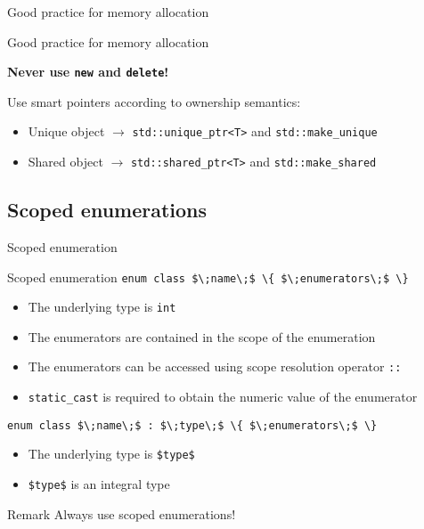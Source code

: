 \begin{frame}{Good practice for memory allocation}{}
  \begin{block}{Good practice for memory allocation}
    \begin{center}
      \Large
      \bfseries
      Never use \lstinline!new! and \lstinline!delete!!
    \end{center}

    Use smart pointers according to ownership semantics:
    \begin{itemize}
    \item
      Unique object $\to$ \lstinline!std::unique_ptr<T>! and \lstinline!std::make_unique!
    \item
      Shared object $\to$ \lstinline!std::shared_ptr<T>! and \lstinline!std::make_shared!
    \end{itemize}
  \end{block}

  \begin{example}
  \end{example}
\end{frame}


\subsection{Scoped enumerations}

\begin{frame}{Scoped enumeration}{}
  \begin{block}{Scoped enumeration}
    {
      \hfill\lstinline[mathescape]!enum class $\;name\;$ \{ $\;enumerators\;$ \}!\hfill
    }

    \begin{itemize}
    \item
      The underlying type is \lstinline!int!
    \item
      The enumerators are contained in the scope of the enumeration
    \item
      The enumerators can be accessed using scope resolution operator \lstinline!::!
    \item
      \lstinline!static_cast! is required to obtain the numeric value of the enumerator
    \end{itemize}

    {
      \hfill\lstinline[mathescape]!enum class $\;name\;$ : $\;type\;$ \{ $\;enumerators\;$ \}!\hfill
    }

    \begin{itemize}
    \item
      The underlying type is \lstinline[mathescape]!$type$!
    \item
      \lstinline[mathescape]!$type$! is an integral type
    \end{itemize}
  \end{block}

  \begin{block}{Remark}
    Always use scoped enumerations!
  \end{block}
\end{frame}

